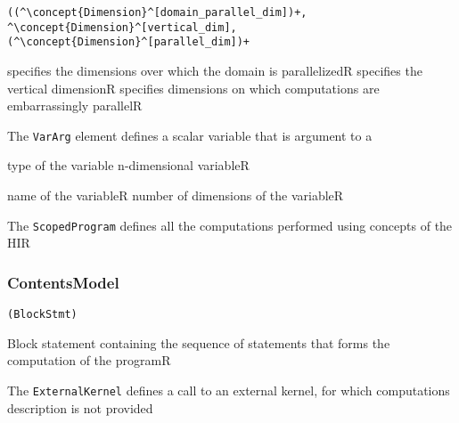 \begin{lstlisting}[style=default]
((^\concept{Dimension}^[domain_parallel_dim])+, ^\concept{Dimension}^[vertical_dim], (^\concept{Dimension}^[parallel_dim])+
\end{lstlisting}

\begin{HIRChildElements}
	{specifies the dimensions over which the domain is parallelized}{R}
	{specifies the vertical dimension}{R}
	{specifies dimensions on which computations are embarrassingly parallel}{R}	
\end{HIRChildElements}

The {\tt VarArg} element defines a scalar variable that is argument to a 


\begin{HIRChildElements}
	{type of the variable n-dimensional variable}{R}
\end{HIRChildElements}

\begin{HIRAttributes}
	{name of the variable}{R}
	{number of dimensions of the variable}{R}
\end{HIRAttributes}


The {\tt ScopedProgram} defines all the computations performed using concepts of the HIR

\subsubsection*{ContentsModel}{}

\begin{lstlisting}[style=default]
(BlockStmt)
\end{lstlisting}

\begin{HIRChildElements}
	{Block statement containing the sequence of statements that forms the computation of the program}{R}
\end{HIRChildElements}


The {\tt ExternalKernel} defines a call to an external kernel, for which computations description is not provided


